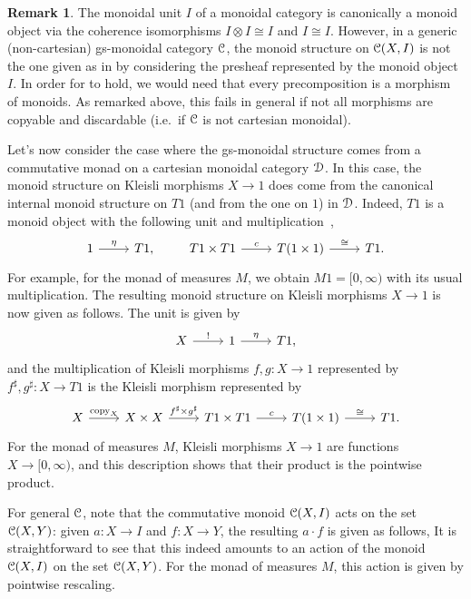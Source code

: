 \documentclass[a4paper,UKenglish,numberwithinsect,cleveref, autoref, thm-restate]{lipics-v2021}
\theoremstyle{plain} %
\theoremstyle{definition} %
\newtheorem{myremark}[mytheorem]{Remark}
\begin{document}
\begin{myremark}
 The monoidal unit $I$ of a monoidal category is canonically a monoid object via the coherence isomorphisms $I\otimes I\cong I$ and $I\cong I$. 
 However, in a generic (non-cartesian) gs-monoidal category $\mathcal{C}$, the monoid structure on $\mathcal{C}(X,I)$ is not the one given as in  by considering the presheaf represented by the monoid object $I$. In order for  to hold, we would need that every precomposition is a morphism of monoids. As remarked above, this fails in general if not all morphisms are copyable and discardable (i.e.~if $\mathcal{C}$ is not cartesian monoidal).
\end{myremark}


Let's now consider the case where the gs-monoidal structure comes from a commutative monad on a cartesian monoidal category $\mathcal{D}$. 
In this case, the monoid structure on Kleisli morphisms $X\to 1$ does come from the canonical internal monoid structure on $T1$ (and from the one on $1$) in $\mathcal{D}$.
Indeed, $T1$ is a monoid object with the following unit and multiplication~\cite[Section~10]{kock2012distributions},
 \[
 \begin{tikzcd}
  1 \ar{r}{\eta} & T1 ,
 \end{tikzcd}
 \qquad
 \begin{tikzcd}
  T1 \times T1 \ar{r}{c} & T(1\times 1) \ar{r}{\cong} & T1 .
 \end{tikzcd}
 \]
 For example, for the monad of measures $M$, we obtain $M1=[0,\infty)$ with its usual multiplication.
 The resulting monoid structure on Kleisli morphisms $X\to 1$ is now given as follows. The unit is given by
 \[
 \begin{tikzcd}
  X \ar{r}{!} & 1 \ar{r}{\eta} & T1 ,
 \end{tikzcd}
 \]
 and the multiplication of Kleisli morphisms $f, g : X \to 1$ represented by $f^\sharp,g^\sharp:X\to T1$ is the Kleisli morphism represented by
 \[
 \begin{tikzcd}
  X \ar{r}{\mathrm{copy}_X} & X\times X \ar{r}{f^\sharp\times g^\sharp} &
  T1 \times T1 \ar{r}{c} & T(1\times 1) \ar{r}{\cong} & T1 .
 \end{tikzcd}
 \]
 For the monad of measures $M$, Kleisli morphisms $X\to 1$ are functions $X\to [0,\infty)$, and this description shows that their product is the pointwise product.

For general $\mathcal{C}$, note that the commutative monoid $\mathcal{C}(X,I)$ acts on the set $\mathcal{C}(X,Y)$: given $a:X\to I$ and $f:X\to Y$, the resulting $a\cdot f$ is given as follows,
It is straightforward to see that this indeed amounts to an action of the monoid $\mathcal{C}(X,I)$ on the set $\mathcal{C}(X,Y)$.
For the monad of measures $M$, this action is given by pointwise rescaling.
\end{document}
